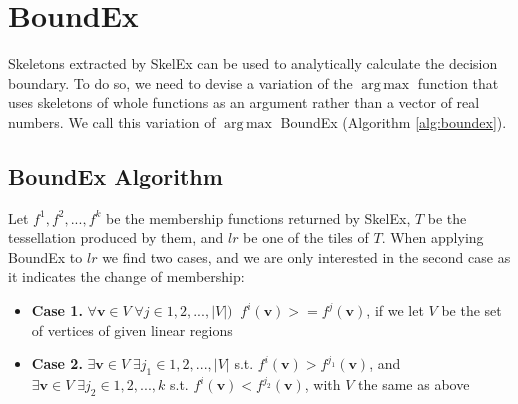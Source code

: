 \documentclass{article}
\DeclareMathOperator*{\argmax}{arg\,max}
\begin{document}
\section{BoundEx}
\label{sec:4}

Skeletons extracted by SkelEx can be used to analytically calculate the decision boundary. To do so, we need to devise a variation of the $\argmax$ function that uses skeletons of whole functions as an argument rather than a vector of real numbers. We call this variation of $\argmax$ BoundEx (Algorithm \ref{alg:boundex}).

\subsection{BoundEx Algorithm}

Let $f^1, f^2, ..., f^k$ be the membership functions returned by SkelEx, $T$ be the tessellation produced by them, and $lr$ be one of the tiles of $T$. When applying BoundEx to $lr$ we find two cases, and we are only interested in the second case as it indicates the change of membership:
\begin{itemize}
    \item \textbf{Case 1.} $\forall \mathbf{v}\in V \; \forall j\in{1, 2, ..., |V|)} \;\;f^i(\mathbf{v}) >= f^j(\mathbf{v})$, if we let $V$ be the set of vertices of given linear regions
    \item \textbf{Case 2.} $\exists \mathbf{v}\in V \; \exists j_1\in{1, 2, ..., |V|}$ s.t. $f^i(\mathbf{v}) > f^{j_1}(\mathbf{v})$, and $\exists \mathbf{v}\in V \; \exists j_2\in{1, 2, ..., k}$ s.t. $f^i(\mathbf{v}) < f^{j_2}(\mathbf{v})$, with $V$ the same as above
\end{itemize}
\end{document}
